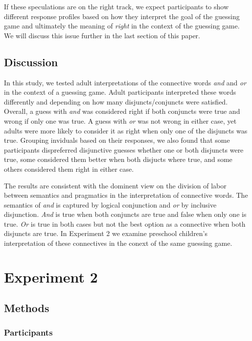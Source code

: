 \documentclass[10pt, letterpaper]{article}
\begin{document}
If these speculations are on the right track, we expect participants to
show different response profiles based on how they interpret the goal of
the guessing game and ultimately the meaning of \emph{right} in the
context of the guessing game. We will discuss this issue further in the
last section of this paper.

\subsection{Discussion}\label{discussion}

In this study, we tested adult interpretations of the connective words
\emph{and} and \emph{or} in the context of a guessing game. Adult
participants interpreted these words differently and depending on how
many disjuncts/conjuncts were satisfied. Overall, a guess with
\emph{and} was considered right if both conjuncts were true and wrong if
only one was true. A guess with \emph{or} was not wrong in either case,
yet adults were more likely to consider it as right when only one of the
disjuncts was true. Grouping inviduals based on their responses, we also
found that some participants dispreferred disjunctive guesses whether
one or both disjuncts were true, some considered them better when both
disjucts where true, and some others considered them right in either
case.

The results are consistent with the dominent view on the division of
labor between semantics and pragmatics in the interpretation of
connective words. The semantics of \emph{and} is captured by logical
conjunction and \emph{or} by inclusive disjunction. \emph{And} is true
when both conjuncts are true and false when only one is true. \emph{Or}
is true in both cases but not the best option as a connective when both
disjuncts are true. In Experiment 2 we examine preschool children's
interpretation of these connectives in the conext of the same guessing
game.

\section{Experiment 2}\label{experiment-2}

\subsection{Methods}\label{methods-1}

\subsubsection{Participants}\label{participants-1}
\end{document}
